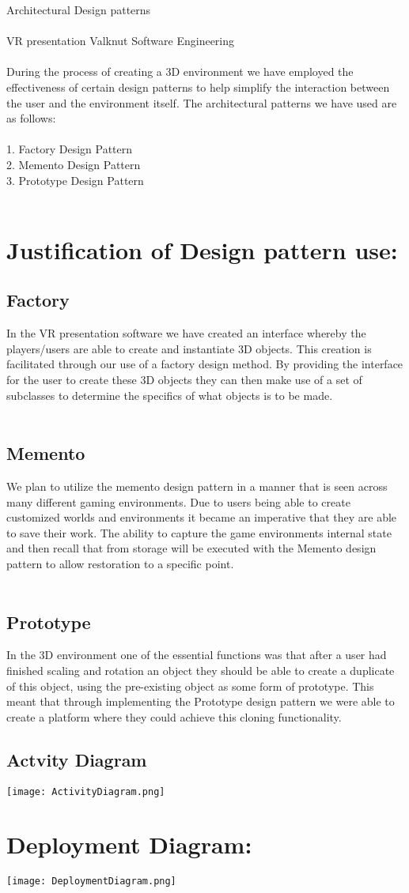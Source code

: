 {\Large Architectural Design patterns} \\\\
 VR presentation Valknut Software Engineering \\\\
During the process of creating a 3D environment we have employed the effectiveness of certain design patterns to help simplify the interaction between the user and the environment itself. The architectural patterns we have used are as follows:\\\\
1.	Factory Design Pattern\\
2.	Memento Design Pattern\\
3.	Prototype Design Pattern\\\\
	\section{Justification of Design pattern use:}
	\subsection{Factory}
	In the VR presentation software we have created an interface whereby the players/users are able to create and instantiate 3D objects. This creation is facilitated through our use of a factory design method. By providing the interface for the user to create these 3D objects they can then make use of a set of subclasses to determine the specifics of what objects is to be made.\\\\
	\subsection{Memento}
	We plan to utilize the memento design pattern in a manner that is seen across many different gaming environments. Due to users being able to create customized worlds and environments it became an imperative that they are able to save their work. The ability to capture the game environments internal state and then recall that from storage will be executed with the Memento design pattern to allow restoration to a specific point.\\\\
	\subsection{Prototype}
	In the 3D environment one of the essential functions was that after a user had finished scaling and rotation an object they should be able to create a duplicate of this object, using the pre-existing object as some form of prototype. This meant that through implementing the Prototype design pattern we were able to create a platform where they could achieve this cloning functionality.
  	\subsection{Actvity Diagram}
	\texttt{[image: ActivityDiagram.png]}

	\section{Deployment Diagram:}
	\texttt{[image: DeploymentDiagram.png]}
